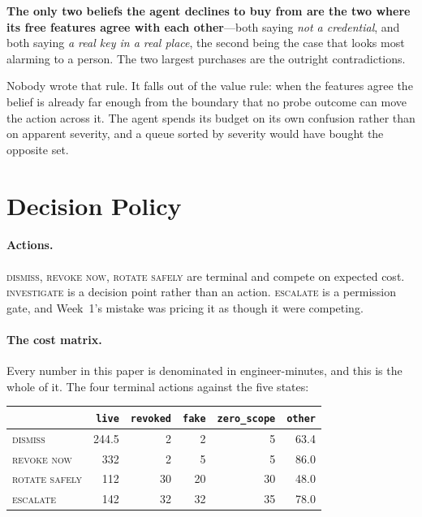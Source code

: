 \documentclass{article}
\begin{document}
\textbf{The only two beliefs the agent declines to buy from are the two where its
free features agree with each other}---both saying \emph{not a credential}, and
both saying \emph{a real key in a real place}, the second being the case that
looks most alarming to a person. The two largest purchases are the outright
contradictions.

Nobody wrote that rule. It falls out of the value rule: when the features agree
the belief is already far enough from the boundary that no probe outcome can move
the action across it. The agent spends its budget on its own confusion rather
than on apparent severity, and a queue sorted by severity would have bought the
opposite set.

\section{Decision Policy}
\label{sec:policy}

\paragraph{Actions.} \textsc{dismiss}, \textsc{revoke now}, \textsc{rotate
safely} are terminal and compete on expected cost. \textsc{investigate} is a
decision point rather than an action. \textsc{escalate} is a permission gate, and
Week~1's mistake was pricing it as though it were competing.

\paragraph{The cost matrix.} Every number in this paper is denominated in
engineer-minutes, and this is the whole of it. The four terminal actions against
the five states:

\begin{center}
\small
\begin{tabular}{@{}lrrrrr@{}}
\toprule
& \texttt{live} & \texttt{revoked} & \texttt{fake} & \texttt{zero\_scope} & \texttt{other} \\
\midrule
\textsc{dismiss} & 244.5 & 2 & 2 & 5 & 63.4 \\
\textsc{revoke now} & 332 & 2 & 5 & 5 & 86.0 \\
\textsc{rotate safely} & 112 & 30 & 20 & 30 & 48.0 \\
\textsc{escalate} & 142 & 32 & 32 & 35 & 78.0 \\
\bottomrule
\end{tabular}
\end{center}
\end{document}
